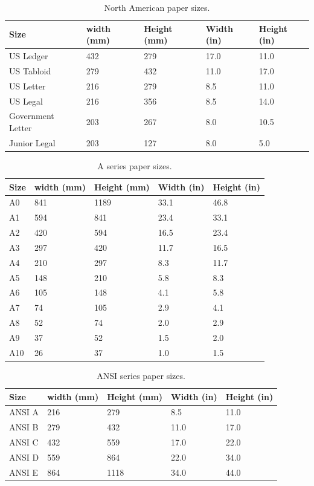 \begin{table}[ht]
\caption{North American paper sizes.}
\begin{tabular}{lllll}
\toprule
Size &width (mm)  &Height (mm)  &Width (in) &Height (in)\\
\midrule
US Ledger   &432 &279 & 17.0 &11.0\\
US Tabloid &279 & 432 & 11.0 &17.0\\
US Letter  &216 & 279 & 8.5 &11.0\\
US Legal   &216 &356 & 8.5 & 14.0\\
Government Letter &203 & 267 & 8.0 &10.5\\
Junior Legal &203 & 127 & 8.0 & 5.0\\
\bottomrule
\end{tabular}
\end{table}

\clearpage

\begin{table}[ht]
\caption{A series paper sizes.}
\begin{tabular}{lllll}
\toprule
Size &width (mm)  &Height (mm)  &Width (in) &Height (in)\\
\midrule
A0   &841 &1189 &33.1 & 46.8\\
A1   &594 & 841 &23.4 & 33.1\\
A2   & 420 & 594 &16.5 &23.4\\
A3   &297 & 420 &11.7 &16.5\\
A4   &210 &297 &8.3 &11.7\\ 
A5   &148 & 210 &5.8 & 8.3\\
A6   &105 & 148 & 4.1 & 5.8\\
A7   & 74 & 105 & 2.9 & 4.1\\
A8   &52 & 74 & 2.0 & 2.9\\
A9   &37 & 52 & 1.5 & 2.0\\
A10  & 26 & 37 & 1.0 & 1.5\\
\bottomrule
\end{tabular}
\end{table}


\begin{table}[ht]
\caption{ANSI series paper sizes.}
\begin{tabular}{lllll}
\toprule
Size &width (mm)  &Height (mm)  &Width (in) &Height (in)\\
\midrule
ANSI A &216 &279 &8.5 &11.0\\
ANSI B &279 &432 &11.0 &17.0\\
ANSI C &432 &559 &17.0 &22.0\\
ANSI D &559 &864 &22.0 &34.0\\
ANSI E &864 &1118 &34.0 &44.0\\

\bottomrule
\end{tabular}
\end{table}

